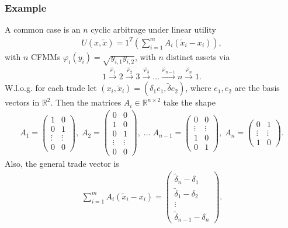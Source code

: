 \subsubsection{Example}
A common case is an $n$ cyclic arbitrage under linear utility
\begin{align}
 U(x, \tilde{x}) =1^{T}\left(\sum_{i=1}^{m} A_i(\tilde{x}_i-x_i)\right) ,
\end{align}
with $n$ CFMMs $\varphi_i(y_i) =
\sqrt{y_{i,1}y_{i,2}}$, with $n$ distinct assets via
\begin{align}
    1 \xrightarrow{\varphi_1} 2 \xrightarrow{\varphi_2} 3
    \xrightarrow{\varphi_3} \hdots \xrightarrow{\varphi_{n-1}} n
    \xrightarrow{\varphi_n} 1.
\end{align}
W.l.o.g. for each trade let $(x_i, \tilde{x}_i) = (\delta_1e_1,
\tilde{\delta}e_2)$, where $e_1, e_2$ are the basis vectors in
$\mathbb{R}^{2}$. Then the matrices $A_i \in \mathbb{R}^{n\times2}  $ take the shape
\begin{align}
   A_1 =
   \begin{pmatrix}
   1 & 0 \\
   0 & 1 \\
   \vdots & \vdots \\
   0 & 0
    \end{pmatrix},\;
   A_2 =
   \begin{pmatrix}
   0 & 0 \\
   1 & 0 \\
   0 & 1 \\
   \vdots & \vdots \\
   0 & 0
    \end{pmatrix},\; \ldots  \;
   A_{n-1} =
   \begin{pmatrix}
   0 & 0 \\
   \vdots & \vdots \\
   1 & 0\\
   0 & 1
    \end{pmatrix},\;
   A_n =
   \begin{pmatrix}
   0 & 1 \\
   \vdots & \vdots \\
   1 & 0
    \end{pmatrix}.
\end{align}
Also, the general trade vector is
\begin{align}
    \sum_{i=1}^{m} A_i(\tilde{x}_i-x_i) =
    \begin{pmatrix}
        \tilde{\delta}_n - \delta_1\\
        \tilde{\delta}_1 -\delta_2\\
        \vdots\\
        \tilde{\delta}_{n-1} - \delta_n
    \end{pmatrix}.
\end{align}
